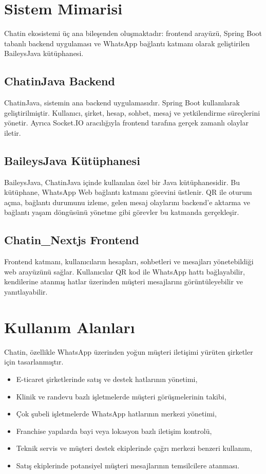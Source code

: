 \documentclass[12pt,a4paper]{article}
\begin{document}
\section{Sistem Mimarisi}

Chatin ekosistemi üç ana bileşenden oluşmaktadır: frontend arayüzü, Spring Boot tabanlı backend uygulaması ve WhatsApp bağlantı katmanı olarak geliştirilen BaileysJava kütüphanesi.

\subsection{ChatinJava Backend}

ChatinJava, sistemin ana backend uygulamasıdır. Spring Boot kullanılarak geliştirilmiştir. Kullanıcı, şirket, hesap, sohbet, mesaj ve yetkilendirme süreçlerini yönetir. Ayrıca Socket.IO aracılığıyla frontend tarafına gerçek zamanlı olaylar iletir.

\subsection{BaileysJava Kütüphanesi}

BaileysJava, ChatinJava içinde kullanılan özel bir Java kütüphanesidir. Bu kütüphane, WhatsApp Web bağlantı katmanı görevini üstlenir. QR ile oturum açma, bağlantı durumunu izleme, gelen mesaj olaylarını backend'e aktarma ve bağlantı yaşam döngüsünü yönetme gibi görevler bu katmanda gerçekleşir.

\subsection{Chatin\_Nextjs Frontend}

Frontend katmanı, kullanıcıların hesapları, sohbetleri ve mesajları yönetebildiği web arayüzünü sağlar. Kullanıcılar QR kod ile WhatsApp hattı bağlayabilir, kendilerine atanmış hatlar üzerinden müşteri mesajlarını görüntüleyebilir ve yanıtlayabilir.

\section{Kullanım Alanları}

Chatin, özellikle WhatsApp üzerinden yoğun müşteri iletişimi yürüten şirketler için tasarlanmıştır.

\begin{itemize}
    \item E-ticaret şirketlerinde satış ve destek hatlarının yönetimi,
    \item Klinik ve randevu bazlı işletmelerde müşteri görüşmelerinin takibi,
    \item Çok şubeli işletmelerde WhatsApp hatlarının merkezi yönetimi,
    \item Franchise yapılarda bayi veya lokasyon bazlı iletişim kontrolü,
    \item Teknik servis ve müşteri destek ekiplerinde çağrı merkezi benzeri kullanım,
    \item Satış ekiplerinde potansiyel müşteri mesajlarının temsilcilere atanması.
\end{itemize}
\end{document}
